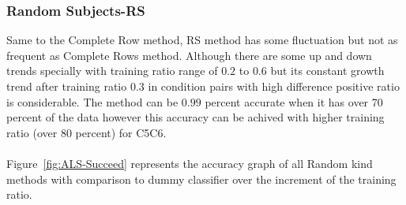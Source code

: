 \documentclass[10pt, conference, compsocconf]{IEEEtran}
\begin{document}
\subsubsection{Random Subjects-RS}
Same to the Complete Row method, RS method has some fluctuation but not as frequent 
as Complete Rows method. Although there are some up and down trends specially with 
training ratio range of $0.2$ to $0.6$ but its constant growth trend after 
training ratio $0.3$ in condition pairs with high difference positive ratio is considerable.
The method can be $0.99$ percent accurate when it has over 70 percent of the data however 
this accuracy can be achived with higher training ratio (over 80 percent) for C5C6.  
\\
\\
\noindent Figure~\ref{fig:ALS-Succeed} represents
the accuracy graph of all Random kind methods with comparison to dummy
classifier over the increment of the training ratio.\\
\end{document}
